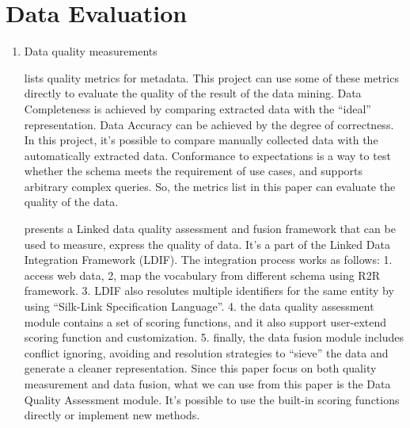 \section{Data Evaluation}
\begin{enumerate}
\item
Data quality measurements

\cite{ochoa2006} lists quality metrics for metadata. This project can use some of these metrics directly to evaluate the quality of the result of the data mining. Data Completeness is achieved by comparing extracted data with the ``ideal'' representation. Data Accuracy can be achieved by the degree of correctness. In this project, it's possible to compare manually collected data with the automatically extracted data. Conformance to expectations is a way to test whether the schema meets the requirement of use cases, and supports arbitrary complex queries. So, the metrics list in this paper can evaluate the quality of the data.

\cite{mendes2012} presents a Linked data quality assessment and fusion framework that can be used to measure, express the quality of data. It's a part of the Linked Data Integration Framework (LDIF). The integration process works as follows: 1. access web data, 2, map the vocabulary from different schema using R2R framework. 3. LDIF also resolutes multiple identifiers for the same entity by using ``Silk-Link Specification Language''. 4. the data quality assessment module contains a set of scoring functions, and it also support user-extend scoring function and customization. 5. finally, the data fusion module includes conflict ignoring, avoiding and resolution strategies to ``sieve'' the data and generate a cleaner representation. Since this paper focus on both quality measurement and data fusion, what we can use from this paper is the Data Quality Assessment module. It's possible to use the built-in scoring functions directly or implement new methods.

\end{enumerate}


